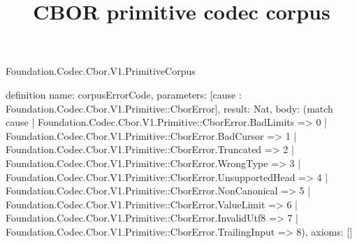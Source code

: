\begin{lexlean}{Foundation.Codec.Cbor.V1.PrimitiveCorpus}
\title{CBOR primitive codec corpus}
\begin{semanticmodule}
definition{
  name: corpusErrorCode,
  parameters: [cause : Foundation.Codec.Cbor.V1.Primitive::CborError],
  result: Nat,
  body: (match cause
    | Foundation.Codec.Cbor.V1.Primitive::CborError.BadLimits => 0
    | Foundation.Codec.Cbor.V1.Primitive::CborError.BadCursor => 1
    | Foundation.Codec.Cbor.V1.Primitive::CborError.Truncated => 2
    | Foundation.Codec.Cbor.V1.Primitive::CborError.WrongType => 3
    | Foundation.Codec.Cbor.V1.Primitive::CborError.UnsupportedHead => 4
    | Foundation.Codec.Cbor.V1.Primitive::CborError.NonCanonical => 5
    | Foundation.Codec.Cbor.V1.Primitive::CborError.ValueLimit => 6
    | Foundation.Codec.Cbor.V1.Primitive::CborError.InvalidUtf8 => 7
    | Foundation.Codec.Cbor.V1.Primitive::CborError.TrailingInput => 8),
  axioms: []
}


\end{semanticmodule}
\end{lexlean}
